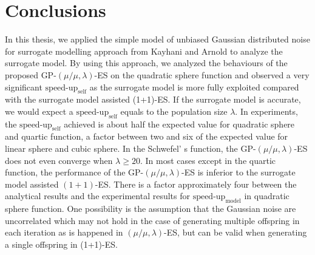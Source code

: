 









\section{Conclusions}
In this thesis, we applied the simple model of unbiased Gaussian distributed noise for surrogate modelling approach from Kayhani and Arnold \cite{DBLP:conf/ppsn/KayhaniA18} to analyze the surrogate model. By using this approach, we analyzed the behaviours of the proposed GP-$(\mu/\mu,\lambda)$-ES on the quadratic sphere function and observed a very significant $\text{speed-up}_{\text{self}}$ as the surrogate model is more fully exploited compared with the surrogate model assisted (1+1)-ES. If the surrogate model is accurate, we would expect a $\text{speed-up}_{\text{self}}$ equals to the population size $\lambda$. In experiments, the $\text{speed-up}_{\text{self}}$ achieved is about half the expected value for quadratic sphere and quartic function, a factor between two and six of the expected value for linear sphere and cubic sphere. In the Schwefel’ s function, the GP-$(\mu/\mu,\lambda)$-ES does not even converge when $\lambda \geq 20$. In most cases except in the quartic function, the performance of the GP-$(\mu/\mu,\lambda)$-ES is inferior to the surrogate model assisted $(1+1)$-ES. There is a factor approximately four between the analytical results and the experimental results for $\text{speed-up}_{\text{model}}$ in quadratic sphere function. One possibility is the assumption that the Gaussian noise are uncorrelated which may not hold in the case of generating multiple offspring in each iteration as is happened in $(\mu/\mu,\lambda)$-ES, but can be valid when generating a single offspring in (1+1)-ES. 

